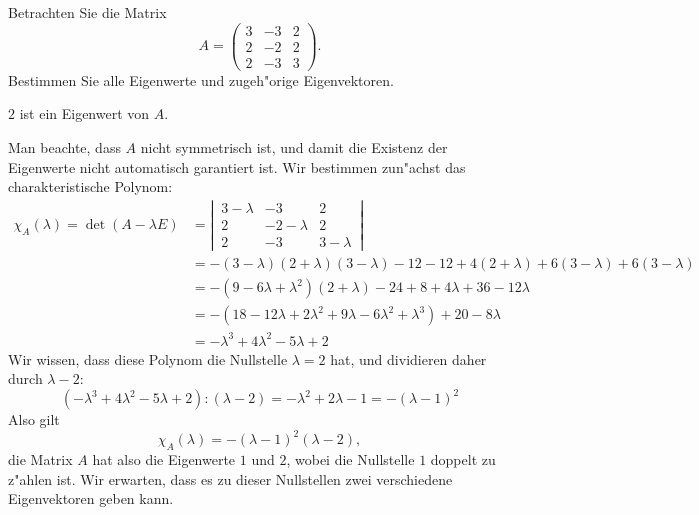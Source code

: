 Betrachten Sie die Matrix
\[
A
=
\begin{pmatrix}
3&-3&2\\
2&-2&2\\
2&-3&3
\end{pmatrix}.
\]
Bestimmen Sie alle Eigenwerte und zugeh"orige Eigenvektoren.

\begin{hinweis} $2$ ist ein Eigenwert von $A$.
\end{hinweis}

\begin{loesung}
Man beachte, dass $A$ nicht symmetrisch ist, und damit die Existenz der
Eigenwerte nicht automatisch garantiert ist.
Wir bestimmen zun"achst das charakteristische Polynom:
\begin{align*}
\chi_A(\lambda)=
\det (A-\lambda E)
&=
\left|\,
\begin{matrix}
3-\lambda&-3&2\\
2&-2-\lambda&2\\
2&-3&3-\lambda
\end{matrix}
\,\right|
\\
&=-(3-\lambda)(2+\lambda)(3-\lambda) -12-12
+4(2+\lambda)+6(3-\lambda)+6(3-\lambda)
\\
&=
-(9-6\lambda+\lambda^2)(2+\lambda)-24 +8+4\lambda +36-12\lambda
\\
&=
-(18-12\lambda+2\lambda^2+9\lambda -6\lambda^2+\lambda^3)+20-8\lambda
\\
&=
-\lambda^3+4\lambda^2-5\lambda+2
\end{align*}
Wir wissen, dass diese Polynom die Nullstelle $\lambda=2$ hat, und
dividieren daher durch $\lambda -2$:
\[
(-\lambda^3+4\lambda^2-5\lambda+2):(\lambda -2)=-\lambda^2+2\lambda-1
=-(\lambda -1)^2
\]
Also gilt
\[
\chi_A(\lambda)=-(\lambda -1)^2(\lambda -2),
\]
die Matrix $A$ hat also die Eigenwerte $1$ und $2$, wobei die Nullstelle
$1$ doppelt zu z"ahlen ist. Wir erwarten, dass es zu dieser Nullstellen
zwei verschiedene Eigenvektoren geben kann.


\end{loesung}
